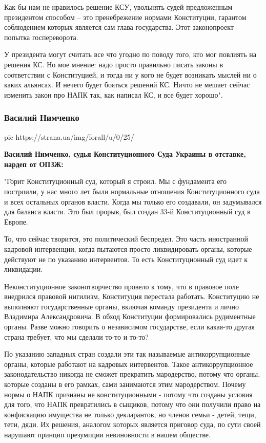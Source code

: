 Как бы нам не нравилось решение КСУ, увольнять судей предложенным президентом
способом – это пренебрежение нормами Конституции, гарантом соблюдением которых
является сам глава государства. Этот законопроект - попытка госпереворота.

У президента могут считать все что угодно по поводу того, кто мог повлиять на
решения КС. Но мое мнение: надо просто правильно писать законы в соответствии с
Конституцией, и тогда ни у кого не будет возникать мыслей ни о каких альянсах.
И нечего будет бояться решений КС. Ничто не мешает сейчас изменить закон про
НАПК так, как написал КС, и все будет хорошо". 

\subsubsection{Василий Нимченко}

\ifcmt
	pic https://strana.ua/img/forall/u/0/25/%
\fi

{\bfseries 
Василий Нимченко, судья Конституционного Суда Украины в отставке, нардеп от ОПЗЖ:
}

"Горит Конституционный суд, который я строил. Мы с фундамента его построили, у
нас много лет были нормальные отношения Конституционного суда и всех остальных
органов власти. Когда мы только его создавали, он задумывался для баланса
власти. Это был прорыв, был создан 33-й Конституционный суд в Европе.

То, что сейчас творится, это политический беспредел. Это часть иностранной
кадровой интервенции, когда пытаются просто ликвидировать органы, которые
действуют не по указанию интервентов. То есть Конституционный суд идет к
ликвидации.

Неконституционное законотворчество провело к тому, что в правовое поле
внедрился правовой нигилизм, Конституция перестала работать. Конституцию не
выполняют государственные органы, включая команду президента и лично Владимира
Александровича. В обход Конституции формировались рудиментные органы. Разве
можно говорить о независимом государстве, если какая-то другая страна требует,
что мы сделали то-то и то-то?

По указанию западных стран создали эти так называемые антикоррупционные органы,
которые работают на кадровых интервентов. Такое антикоррупционное
законодательство никогда не сможет прекратить мародерство, потому что органы,
которые созданы в его рамках, сами занимаются этим мародерством. Почему нормы о
НАПК признаны не конституционными - потому что созданы условия для того, что
НАПК превратились в сыщиков, потому что они получили право на конфискацию
имущества не только декларантов, но членов семьи - детей, тещи, тети, дяди. Их
решения, аналогом которых является приговор суда, по сути своей нарушают
принцип презумпции невиновности в нашем обществе.

